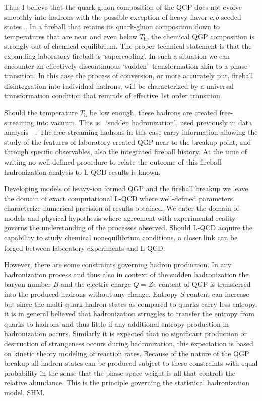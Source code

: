 \documentclass{appolb}
\begin{document}
Thus I believe that the quark-gluon composition of the QGP does not evolve smoothly into hadrons with the possible exception of heavy flavor $c,b$ seeded states~\cite{Thews:2000rj}. In a fireball that retains its quark-gluon composition down to temperatures that are near and even below $T_\mathrm{h}$, the chemical QGP composition is strongly out of chemical equilibrium. The proper technical statement is that the expanding laboratory fireball is \lq supercooling\rq. In such a situation we can encounter an effectively discontinuous \lq sudden\rq\ transformation akin to a phase transition. In this case the process of conversion, or more accurately put, fireball disintegration into individual hadrons, will be characterized by a universal transformation condition that reminds of effective 1st order transition. 

Should the temperature $T_\mathrm{h}$ be low enough, these hadrons are created free-streaming into vacuum. This is~\cite{Rafelski:2000by} \lq sudden hadronization\rq, used previously in data analysis~~\cite{Rafelski:1991rh}. The free-streaming hadrons in this case carry information allowing the study of the features of laboratory created QGP near to the breakup point, and through specific observables, also the integrated fireball history. At the time of writing no well-defined procedure to relate the outcome of this fireball hadronization analysis to L-QCD results is known. 

Developing models of heavy-ion formed QGP and the fireball breakup we leave the domain of exact computational L-QCD where well-defined parameters characterize numerical precision of results obtained. We enter the domain of models and physical hypothesis where agreement with experimental reality governs the understanding of the processes observed. Should L-QCD acquire the capability to study chemical nonequilibrium conditions, a closer link can be forged between laboratory experiments and L-QCD.

However, there are some constraints governing hadron production. In any hadronization process and thus also in context of the sudden hadronization the baryon number $B$ and the electric charge $Q=Ze$ content of QGP is transferred into the produced hadrons without any change. Entropy $S$ content can increase but since the multi-quark hadron states as compared to quarks carry less entropy, it is in general believed that hadronization struggles to transfer the entropy from quarks to hadrons and thus little if any additional entropy production in hadronization occurs. Similarly it is expected that no significant production or destruction of strangeness occurs during hadronization, this expectation is based on kinetic theory modeling of reaction rates. Because of the nature of the QGP breakup all hadron states can be produced subject to these constraints with equal probability in the sense that the phase space weight is all that controls the relative abundance. This is the principle governing the statistical hadronization model, SHM.
\end{document}
